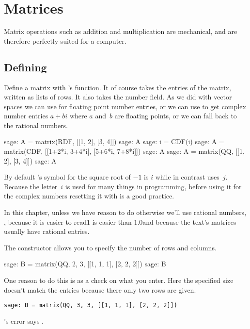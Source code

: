 \chapter{Matrices}

Matrix operations such as addition and multiplication
are mechanical, and are therefore perfectly suited for 
a computer.



\section{Defining}
Define a matrix with \Sage's  function.
It of course takes the entries of the matrix, written as lists of rows.
It also takes the number field.
As we did with vector spaces we can use  for 
floating point number entries, 
or we can use  to get complex number entries $a+bi$ where 
$a$ and~$b$ are floating points,
or we can fall back to the rational numbers.
\begin{sagecommandline}
sage: A = matrix(RDF, [[1, 2], [3, 4]])
sage: A
sage: i = CDF(i)
sage: A = matrix(CDF, [[1+2*i, 3+4*i], [5+6*i, 7+8*i]])
sage: A
sage: A = matrix(QQ, [[1, 2], [3, 4]])
sage: A                           
\end{sagecommandline}
\noindent
By default \Sage's symbol for the square root of $-1$ is $i$ 
while in contrast \python{} uses~$j$.
Because the letter~$i$ is used for many things in programming,
before using it for the complex numbers
resetting it with  is a good practice.

In this chapter, unless we have reason to do otherwise
we'll use rational numbers, , 
because it is easier to read\Dash $1$ is easier than $1.0$\Dash and 
because the text's matrices usually have rational entries.

The  constructor allows you to specify the number of
rows and columns.
\begin{sagecommandline}
sage: B = matrix(QQ, 2, 3, [[1, 1, 1], [2, 2, 2]])  
sage: B
\end{sagecommandline}
One reason to do this is as a check on what you enter.
Here the specified size doesn't match the entries because
there only two rows are given. 
\begin{lstlisting}[style=python]
sage: B = matrix(QQ, 3, 3, [[1, 1, 1], [2, 2, 2]])  
\end{lstlisting}
\Sage's error says
.


